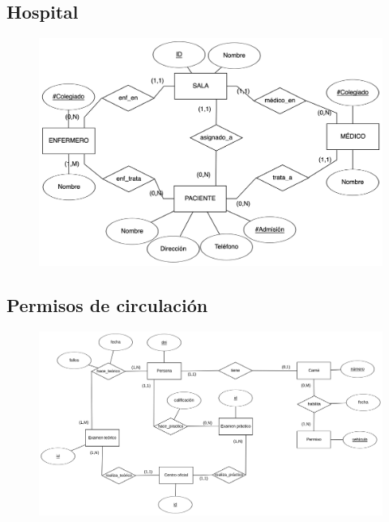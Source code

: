 \documentclass{db-practice}
\begin{document}
\subsection{Hospital}
\begin{figure}[H]
    \centering
    \includegraphics[width=\textwidth]{figs/modelado/ejercicio-4}
\end{figure}

\subsection{Permisos de circulación}
\begin{figure}[H]
    \centering
    \includegraphics[width=\textwidth]{figs/modelado/ejercicio-5}
\end{figure}
\end{document}
